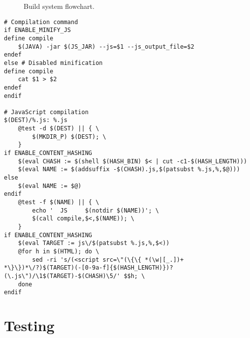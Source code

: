 \begin{figure}[H]
\caption[Build system flowchart]{Build system flowchart.}
\label{fig:build-system-flowchart}
\end{figure}

\newpage

\lstset{language=make}
\begin{lstlisting}[label=lst:build-javascript,caption={
      [Autotools Makefile pattern for JavaScript compilation]
      Autotools Makefile pattern for JavaScript compilation, taken
      from \texttt{www/js/Makefile.am}. The conditional variables
      \texttt{ENABLE\_MINI\_JS} and
      \texttt{ENABLE\_CONTENT\_HASHING} are used to control the
      behaviour of the compilation, and are set by passing argument
      flags to the configuration script.}]
# Compilation command
if ENABLE_MINIFY_JS
define compile
    $(JAVA) -jar $(JS_JAR) --js=$1 --js_output_file=$2
endef
else # Disabled minification
define compile
    cat $1 > $2
endef
endif

# JavaScript compilation
$(DEST)/%.js: %.js
    @test -d $(DEST) || { \
        $(MKDIR_P) $(DEST); \
    }
if ENABLE_CONTENT_HASHING
    $(eval CHASH := $(shell $(HASH_BIN) $< | cut -c1-$(HASH_LENGTH)))
    $(eval NAME := $(addsuffix -$(CHASH).js,$(patsubst %.js,%,$@)))
else
    $(eval NAME := $@)
endif
    @test -f $(NAME) || { \
        echo '  JS     $(notdir $(NAME))'; \
        $(call compile,$<,$(NAME)); \
    }
if ENABLE_CONTENT_HASHING
    $(eval TARGET := js\/$(patsubst %.js,%,$<))
    @for h in $(HTML); do \
        sed -ri 's/(<script src=\"(\{\{ *(\w|[_.])+ *\}\})*\/?)$(TARGET)(-[0-9a-f]{$(HASH_LENGTH)})?(\.js\")/\1$(TARGET)-$(CHASH)\5/' $$h; \
    done
endif
\end{lstlisting}


\section{Testing}

